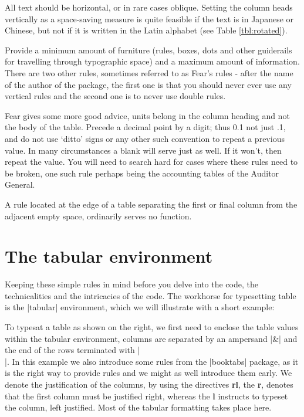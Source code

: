 All text should be horizontal, or in rare cases oblique. Setting the column heads vertically 
as a space-saving measure is quite feasible if the text is in Japanese or Chinese, 
but not if it is written in the Latin alphabet (see Table \ref{tbl:rotated}).


Provide a minimum amount of furniture (rules, boxes, dots and other guiderails for travelling through typographic space) and a maximum amount of information. There are two other rules, sometimes referred to as Fear's rules - after the name of the author of the  package, the first one is that you should never ever use any vertical rules and the second one is to never use double rules\cite{booktabs}.


 Fear gives some more good advice,   units belong in the column heading and not the body of the table. Precede a decimal point by a digit; thus 0.1 not just .1, and do not use `ditto' signs or any other such convention to repeat a previous value. In many circumstances a blank will serve just as well. If it won't,
then repeat the value. You will need to search hard for cases where these rules need to be broken, one such rule perhaps being the accounting tables of the Auditor General. 

A rule located at the edge of a table separating the first or final column from the adjacent empty space, ordinarily serves no function.


\section{The tabular environment}

Keeping these simple rules in mind before you delve into the code, the technicalities and the intricacies of the code. The \latex workhorse for typesetting table is the |tabular| environment, which we will illustrate with a short example:

To typesat a  table as shown on the right, we first need to enclose the table values within the tabular environment, columns are separated by an ampersand |&| and the end of the rows terminated with |\\|.
In this example we also introduce some rules from the |booktabs| package, as it is the right way to provide rules and we might as well introduce them early. We denote the justification of the columns, by using the directives \textbf{rl}, the \textbf{r}, denotes that the first column must be justified right, whereas the \textbf{l} instructs \latex to typeset the column, left justified. Most of the tabular formatting takes place here.

